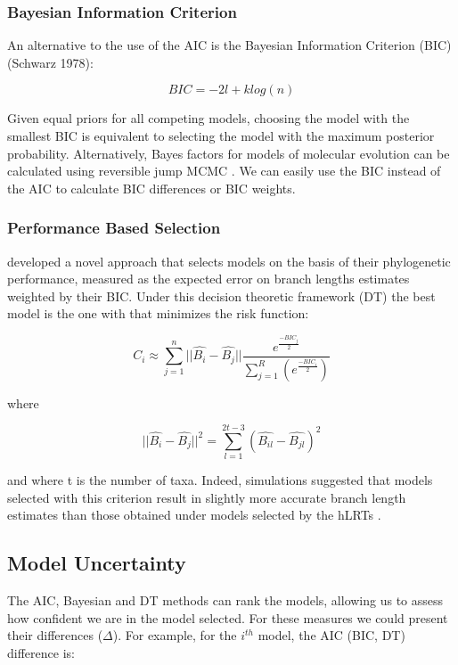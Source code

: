 \documentclass[11pt,twoside,a4paper]{article}
\begin{document}
\subsubsection{Bayesian Information Criterion}

An alternative to the use of the AIC is the Bayesian Information Criterion (BIC) (Schwarz 1978):

\[
BIC=-2l + k log(n)
\]

Given equal priors for all competing models, choosing the model with the smallest BIC is equivalent to selecting the model with the maximum posterior probability. Alternatively, Bayes factors for models of molecular evolution can be calculated using reversible jump MCMC \citep{Huelsenbeck-2004}. We can easily use the BIC instead of the AIC to calculate BIC differences or BIC weights.

\subsubsection{Performance Based Selection}

\citet{Minin-2003} developed a novel approach that selects models on the basis of their phylogenetic performance, measured as the expected error on branch lengths estimates weighted by their BIC. Under this decision theoretic framework (DT) the best model is the one with that minimizes the risk function:

\[
C_i \approx \sum_{j=1}^n||\hat{B_i} - \hat{B_j}||\frac{e^{\frac{-BIC_j}{2}}}{\sum_{j=1}^R(e^\frac{-BIC_i}{2})}
\]

where 

\[
||\hat{B_i} - \hat{B_j}||^2 = \sum_{l=1}^{2t-3}(\hat{B_{il}} - \hat{B_{jl}})^2
\]

and where t is the number of taxa. Indeed, simulations suggested that models selected with this criterion result in slightly more accurate branch length estimates than those obtained under models selected by the hLRTs \citep{Minin-2003, Abdo-2005}.

\subsection{Model Uncertainty}

The AIC, Bayesian and DT methods can rank the models, allowing us to assess how confident we are in the model selected. For these measures we could present their differences ($\Delta$). For example, for the $i^{th}$ model, the AIC (BIC, DT) difference is:
\end{document}
